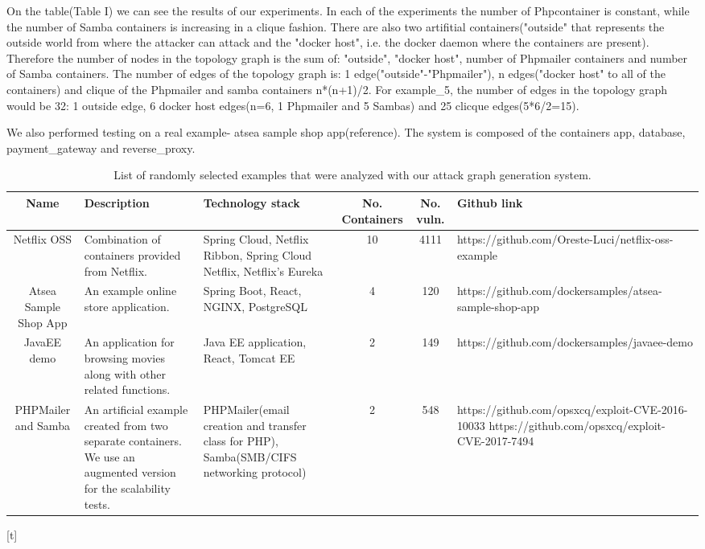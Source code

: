 \documentclass[letterpaper, 10 pt, conference]{ieeeconf}  %
\begin{document}
On the table(Table I) we can see the results of our experiments. In each of the experiments the number of Phpcontainer is constant, while the number of Samba containers is increasing in a clique fashion. There are also two artifitial containers("outside" that represents the outside world from where the attacker can attack and the "docker host", i.e. the docker daemon where the containers are present). Therefore the number of nodes in the topology graph is the sum of: "outside", "docker host", number of Phpmailer containers and number of Samba containers. The number of edges of the topology graph is: 1 edge("outside"-"Phpmailer"), n edges("docker host" to all of the containers) and clique of the Phpmailer and samba containers n*(n+1)/2. For example\_5, the number of edges in the topology graph would be 32: 1 outside edge, 6 docker host edges(n=6, 1 Phpmailer and 5 Sambas) and 25 clicque edges(5*6/2=15).

We also performed testing on a real example- atsea sample shop app(reference). The system is composed of the containers app, database, payment\_gateway and reverse\_proxy.

\begin{table}[t]
	\begin{center}
		\begin{tabular}{ |c|p{30mm}|p{20mm}|c|c|p{45mm}| } 
			\hline
			Name & Description & Technology stack & No. Containers & No. vuln. & Github link \\\hline 
			
			Netflix OSS & Combination of containers provided from Netflix. & Spring Cloud, Netflix Ribbon, Spring Cloud Netflix, Netflix's Eureka & 10 & 4111 & https://github.com/Oreste-Luci/netflix-oss-example \\\hline
			
			Atsea Sample Shop App & An example online store application. & Spring Boot, React, NGINX, PostgreSQL & 4 & 120 & https://github.com/dockersamples/atsea-sample-shop-app \\\hline
			
			JavaEE demo & An application for browsing movies along with other related functions. & Java EE application, React, Tomcat EE & 2 & 149 & https://github.com/dockersamples/javaee-demo \\\hline
			
			PHPMailer and Samba & An artificial example created from two separate containers. We use an augmented version for the scalability tests. & PHPMailer(email creation and transfer class for PHP), Samba(SMB/CIFS networking protocol) & 2 & 548 & https://github.com/opsxcq/exploit-CVE-2016-10033
			https://github.com/opsxcq/exploit-CVE-2017-7494 \\\hline
			
			
			\hline
		\end{tabular}
	\end{center}
	
	\caption{List of randomly selected examples that were analyzed with our attack graph generation system.}
	
\end{table}[t]
\end{document}
